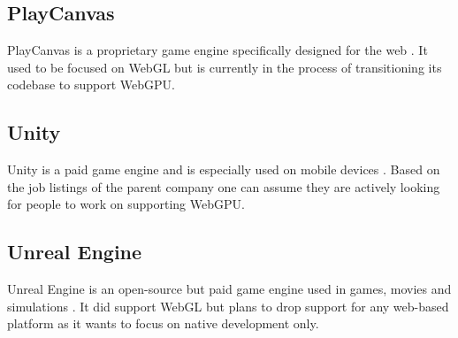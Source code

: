 \subsection{PlayCanvas}
PlayCanvas is a proprietary game engine specifically designed for the
web \parencite{playcanvas}. It used to be focused on WebGL but is
currently in the process of transitioning its codebase to support
WebGPU.

\subsection{Unity}
Unity is a paid game engine and is especially used on mobile devices
\parencite{unity}. Based on the job listings of the parent company one
can assume they are actively looking for people to work on supporting
WebGPU. 

\subsection{Unreal Engine}

Unreal Engine is an open-source but paid game engine used in games,
movies and simulations \parencite{unreal}. It did support WebGL but
plans to drop support for any web-based platform as it wants to focus on
native development only. 